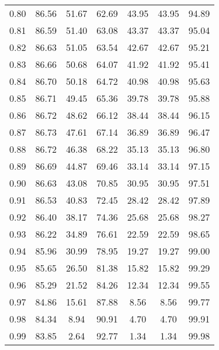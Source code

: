 \begin{tabular}{|c|c|c|c|c|c|c|}
      0.80 &     86.56 &     51.67 &      62.69 &   43.95 &      43.95 &         94.89 \\
      0.81 &     86.59 &     51.40 &      63.08 &   43.37 &      43.37 &         95.04 \\
      0.82 &     86.63 &     51.05 &      63.54 &   42.67 &      42.67 &         95.21 \\
      0.83 &     86.66 &     50.68 &      64.07 &   41.92 &      41.92 &         95.41 \\
      0.84 &     86.70 &     50.18 &      64.72 &   40.98 &      40.98 &         95.63 \\
      0.85 &     86.71 &     49.45 &      65.36 &   39.78 &      39.78 &         95.88 \\
      0.86 &     86.72 &     48.62 &      66.12 &   38.44 &      38.44 &         96.15 \\
      0.87 &     86.73 &     47.61 &      67.14 &   36.89 &      36.89 &         96.47 \\
      0.88 &     86.72 &     46.38 &      68.22 &   35.13 &      35.13 &         96.80 \\
      0.89 &     86.69 &     44.87 &      69.46 &   33.14 &      33.14 &         97.15 \\
      0.90 &     86.63 &     43.08 &      70.85 &   30.95 &      30.95 &         97.51 \\
      0.91 &     86.53 &     40.83 &      72.45 &   28.42 &      28.42 &         97.89 \\
      0.92 &     86.40 &     38.17 &      74.36 &   25.68 &      25.68 &         98.27 \\
      0.93 &     86.22 &     34.89 &      76.61 &   22.59 &      22.59 &         98.65 \\
      0.94 &     85.96 &     30.99 &      78.95 &   19.27 &      19.27 &         99.00 \\
      0.95 &     85.65 &     26.50 &      81.38 &   15.82 &      15.82 &         99.29 \\
      0.96 &     85.29 &     21.52 &      84.26 &   12.34 &      12.34 &         99.55 \\
      0.97 &     84.86 &     15.61 &      87.88 &    8.56 &       8.56 &         99.77 \\
      0.98 &     84.34 &      8.94 &      90.91 &    4.70 &       4.70 &         99.91 \\
      0.99 &     83.85 &      2.64 &      92.77 &    1.34 &       1.34 &         99.98 \\
\bottomrule
\end{tabular}
